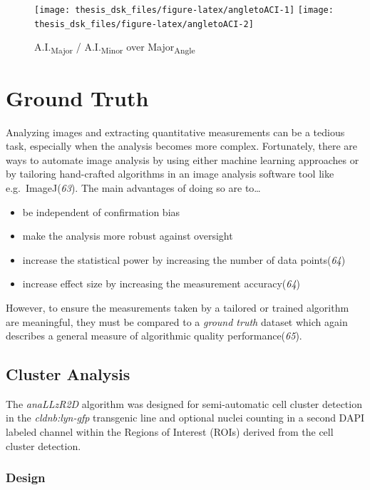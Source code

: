 \documentclass[11pt,singlespacinge,twoside]{reedthesis} %
\providecommand{\tightlist}{%
  \setlength{\itemsep}{0pt}\setlength{\parskip}{0pt}}
\theoremstyle{definition}
\theoremstyle{definition}
\theoremstyle{definition}
\theoremstyle{remark}
\begin{document}
\begin{figure}[H]

{\centering \texttt{[image: thesis\_dsk\_files/figure-latex/angletoACI-1]} \texttt{[image: thesis\_dsk\_files/figure-latex/angletoACI-2]} 

}

\caption{A.I.\textsubscript{Major} / A.I.\textsubscript{Minor} over Major\textsubscript{Angle}}\label{fig:angletoACI}
\end{figure}
\hypertarget{mat-GrTrDat}{%
\section{Ground Truth}\label{mat-GrTrDat}}

Analyzing images and extracting quantitative measurements can be a tedious task, especially when the analysis becomes more complex. Fortunately, there are ways to automate image analysis by using either machine learning approaches or by tailoring hand-crafted algorithms in an image analysis software tool like e.g.~ImageJ(\emph{63}).
The main advantages of doing so are to\ldots{}
\begin{itemize}
\tightlist
\item
  be independent of confirmation bias
\item
  make the analysis more robust against oversight
\item
  increase the statistical power by increasing the number of data points(\emph{64})
\item
  increase effect size by increasing the measurement accuracy(\emph{64})
\end{itemize}
However, to ensure the measurements taken by a tailored or trained algorithm are meaningful, they must be compared to a \emph{ground truth} dataset which again describes a general measure of algorithmic quality performance(\emph{65}).

\hypertarget{cluster-analysis}{%
\subsection{Cluster Analysis}\label{cluster-analysis}}

The \emph{anaLLzR2D} algorithm was designed for semi-automatic cell cluster detection in the \emph{cldnb:lyn-gfp} transgenic line and optional nuclei counting in a second DAPI labeled channel within the Regions of Interest (ROIs) derived from the cell cluster detection.

\hypertarget{design}{%
\subsubsection{Design}\label{design}}
\end{document}

